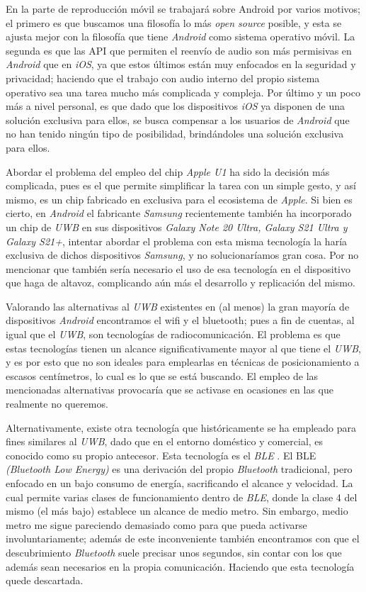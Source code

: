 En la parte de reproducción móvil se trabajará sobre Android por varios motivos;
el primero es que buscamos una filosofía lo más \emph{open source} posible, y
esta se ajusta mejor con la filosofía que tiene \emph{Android} como sistema
operativo móvil. La segunda es que las API que permiten el reenvío de audio son
más permisivas en \emph{Android} que en \emph{iOS}, ya que estos últimos están
muy enfocados en la seguridad y privacidad; haciendo que el trabajo con audio
interno del propio sistema operativo sea una tarea mucho más complicada y
compleja. Por último y un poco más a nivel personal, es que dado que los
dispositivos \emph{iOS} ya disponen de una solución exclusiva para ellos, se
busca compensar a los usuarios de \emph{Android} que no han tenido ningún tipo
de posibilidad, brindándoles una solución exclusiva para ellos.

Abordar el problema del empleo del chip \emph{Apple U1} ha sido la decisión más
complicada, pues es el que permite simplificar la tarea con un simple gesto, y
así mismo, es un chip fabricado en exclusiva para el ecosistema de \emph{Apple}.
Si bien es cierto, en \emph{Android} el fabricante \emph{Samsung} recientemente
también ha incorporado un chip de \emph{UWB} en sus dispositivos \emph{Galaxy
Note 20 Ultra, Galaxy S21 Ultra y Galaxy S21+}, intentar abordar el problema con
esta misma tecnología la haría exclusiva de dichos dispositivos \emph{Samsung},
y no solucionaríamos gran cosa. Por no mencionar que también sería necesario el
uso de esa tecnología en el dispositivo que haga de altavoz, complicando aún más
el desarrollo y replicación del mismo.

Valorando las alternativas al \emph{UWB} existentes en (al menos) la gran
mayoría de dispositivos \emph{Android} encontramos el wifi y el bluetooth; pues
a fin de cuentas, al igual que el \emph{UWB}, son tecnologías de
radiocomunicación. El problema es que estas tecnologías tienen un alcance
significativamente mayor al que tiene el \emph{UWB}, y es por esto que no son
ideales para emplearlas en técnicas de posicionamiento a escasos centímetros, lo
cual es lo que se está buscando. El empleo de las mencionadas alternativas
provocaría que se activase en ocasiones en las que realmente no queremos.

Alternativamente, existe otra tecnología que históricamente se ha empleado para
fines similares al \emph{UWB}, dado que en el entorno doméstico y comercial, es
conocido como su propio antecesor. Esta tecnología es el \emph{BLE} \cite{BLE}.
El BLE \emph{(Bluetooth Low Energy)} es una derivación del propio
\emph{Bluetooth} tradicional, pero enfocado en un bajo consumo de energía,
sacrificando el alcance y velocidad. La cual permite varias clases de
funcionamiento dentro de \emph{BLE}, donde la clase 4 del mismo (el más bajo)
establece un alcance de medio metro. Sin embargo, medio metro me sigue
pareciendo demasiado como para que pueda activarse involuntariamente; además de
este inconveniente también encontramos con que el descubrimiento
\emph{Bluetooth} suele precisar unos segundos, sin contar con los que además
sean necesarios en la propia comunicación. Haciendo que esta tecnología quede
descartada.

